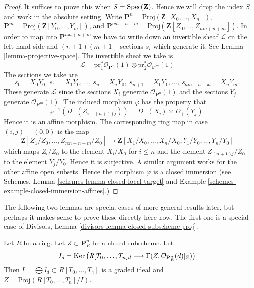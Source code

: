 \begin{proof}
It suffices to prove this when $S = \mathop{\mathrm{Spec}}(\mathbf{Z})$.
Hence we will drop the index $S$ and work in the absolute setting.
Write $\mathbf{P}^n = \text{Proj}(\mathbf{Z}[X_0, \ldots, X_n])$,
$\mathbf{P}^m = \text{Proj}(\mathbf{Z}[Y_0, \ldots, Y_m])$,
and
$\mathbf{P}^{nm + n + m} =
\text{Proj}(\mathbf{Z}[Z_0, \ldots, Z_{nm + n + m}])$.
In order to map into $\mathbf{P}^{nm + n + m}$ we have to
write down an invertible sheaf $\mathcal{L}$ on the left hand
side and $(n + 1)(m + 1)$ sections $s_i$ which generate it.
See Lemma \ref{lemma-projective-space}.
The invertible sheaf we take is
$$
\mathcal{L} =
\text{pr}_1^*\mathcal{O}_{\mathbf{P}^n}(1)
\otimes
\text{pr}_2^*\mathcal{O}_{\mathbf{P}^m}(1)
$$
The sections we take are
$$
s_0 = X_0Y_0, \ s_1 = X_1Y_0, \ldots, \ s_n = X_nY_0,
\ s_{n + 1} = X_0Y_1, \ldots, \ s_{nm + n + m} = X_nY_m.
$$
These generate $\mathcal{L}$ since the sections $X_i$ generate
$\mathcal{O}_{\mathbf{P}^n}(1)$ and the sections $Y_j$ generate
$\mathcal{O}_{\mathbf{P}^m}(1)$. The induced morphism
$\varphi$ has the property that
$$
\varphi^{-1}(D_{+}(Z_{i + (n + 1)j})) = D_{+}(X_i) \times D_{+}(Y_j).
$$
Hence it is an affine morphism. The corresponding ring map in case
$(i, j) = (0, 0)$ is the map
$$
\mathbf{Z}[Z_1/Z_0, \ldots, Z_{nm + n + m}/Z_0]
\longrightarrow
\mathbf{Z}[X_1/X_0, \ldots, X_n/X_0, Y_1/Y_0, \ldots, Y_n/Y_0]
$$
which maps $Z_i/Z_0$ to the element $X_i/X_0$ for $i \leq n$ and
the element $Z_{(n + 1)j}/Z_0$ to the element $Y_j/Y_0$. Hence it
is surjective. A similar argument works for the other affine
open subsets. Hence the morphism $\varphi$ is a closed immersion
(see Schemes, Lemma \ref{schemes-lemma-closed-local-target} and
Example \ref{schemes-example-closed-immersion-affines}.)
\end{proof}

\noindent
The following two lemmas are special cases of more general results later, but
perhaps it makes sense to prove these directly here now. The first one is
a special case of Divisors, Lemma \ref{divisors-lemma-closed-subscheme-proj}.

\begin{lemma}
\label{lemma-closed-in-projective-space}
Let $R$ be a ring. Let $Z \subset \mathbf{P}^n_R$ be a closed subscheme.
Let
$$
I_d = \mathop{\mathrm{Ker}}\left(
R[T_0, \ldots, T_n]_d
\longrightarrow
\Gamma(Z, \mathcal{O}_{\mathbf{P}^n_R}(d)|_Z)\right)
$$
Then $I = \bigoplus I_d \subset R[T_0, \ldots, T_n]$ is
a graded ideal and $Z = \text{Proj}(R[T_0, \ldots, T_n]/I)$.
\end{lemma}

